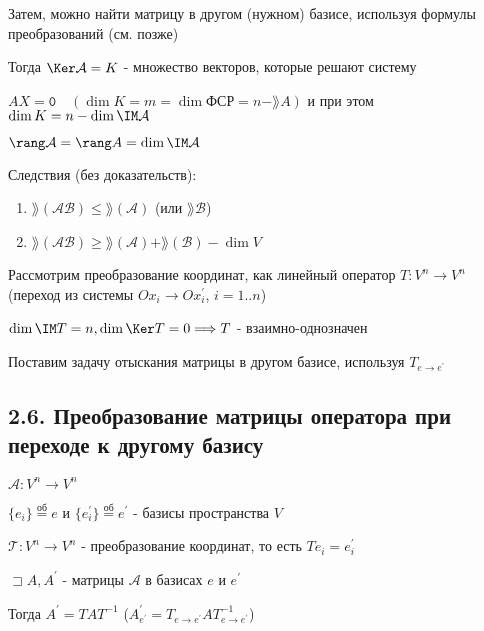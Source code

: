 \documentclass[12pt]{article}
\begin{document}
    Затем, можно найти матрицу в другом (нужном) базисе, используя формулы преобразований (см. \Ths позже)

    Тогда $\Ker \mathcal{A} = K$ - множество векторов, которые решают систему

    $AX = \texttt{0} \quad (\dim K = m = \dim \text{ФСР} = n - \rang A)$ и при этом $\dim K = n - \dim \IM \mathcal{A}$

    $\rang \mathcal{A} = \rang A = \dim \IM \mathcal{A}$

    Следствия (без доказательств):

    \begin{enumerate}
        \item $\rang(\mathcal{AB}) \leq \rang(\mathcal{A})$ (или $\rang \mathcal{B}$)

        \item $\rang(\mathcal{AB}) \geq \rang(\mathcal{A}) + \rang(\mathcal{B}) - \dim V$
    \end{enumerate}

    \Nota Рассмотрим преобразование координат, как линейный оператор $T : V^n \rightarrow V^n$ (переход из системы $Ox_i \rightarrow Ox_i^\prime$, $i = 1..n$)

    $\dim \IM T = n, \dim \Ker T = 0 \Longrightarrow T$ - взаимно-однозначен

    Поставим задачу отыскания матрицы в другом базисе, используя $T_{e \to e^\prime}$

    \subsection[p2\_6]{2.6. Преобразование матрицы оператора при переходе к другому базису}

    \hypertarget{transformationtodifferentbasis}{}

    \begin{MyTheorem}
        \Ths $\mathcal{A} : V^n \rightarrow V^n$

        $\{e_i\} \stackrel{\text{об}}{=} e$ и $\{e^\prime_i\} \stackrel{\text{об}}{=} e^\prime$ - базисы пространства $V$

        $\mathcal{T} : V^n \rightarrow V^n$ - преобразование координат, то есть $Te_i = e^\prime_i$

        $\sqsupset A, A^\prime$ - матрицы $\mathcal{A}$ в базисах $e$ и $e^\prime$

        Тогда $A^\prime = TAT^{-1}$ ($A^\prime_{e^\prime} = T_{e\to e^\prime}AT^{-1}_{e\to e^\prime}$)
    \end{MyTheorem}
\end{document}
